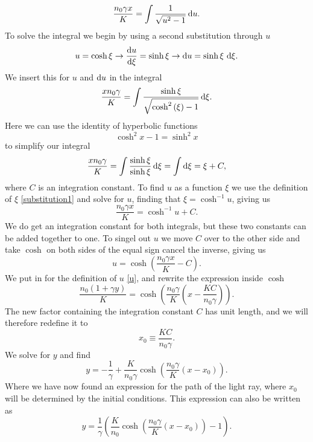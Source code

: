 \documentclass[12pt,twoside]{article}
\begin{document}
\begin{equation}
   \frac{n_0\gamma x}{K} = \int \frac{1}{\sqrt{u^2-1}} \dif u.
\end{equation}
To solve the integral we begin by using a second substitution through $u$
\begin{equation}
  u = \cosh{\xi} \rightarrow \dv{u}{\xi} = \sinh{\xi} \rightarrow \dif u = \sinh{\xi} \, \dif \xi. \label{substitution1}
\end{equation}
We insert this for $u$ and $\dif u$ in the integral
\begin{equation}
   \frac{xn_0\gamma}{K} = \int \frac{\sinh{\xi}}{\sqrt{\cosh^2{(\xi)}-1}} \dif \xi.
\end{equation}
Here we can use the identity of hyperbolic functions
\begin{equation}
\cosh^2{x} -1 = \sinh^2{x}
\end{equation}
to simplify our integral
\begin{equation}
   \frac{xn_0\gamma}{K} = \int \frac{\sinh{\xi}}{\sinh{\xi}} \dif \xi = \int \dif \xi = \xi + C,
\end{equation}
where $C$ is an integration constant.
To find $u$ as a function $\xi$ we use the definition of $\xi$ \eqref{substitution1} and solve for $u$, finding that $\xi = \cosh^{-1}{u}$, giving us
\begin{equation}
   \frac{n_0\gamma x}{K} = \cosh^{-1}{u} + C.
\end{equation}
We do get an integration constant for both integrals, but these two constants can be added together to one. To singel out $u$ we move $C$ over to the other side and take $\cosh{}$ on both sides of the equal sign cancel the inverse, giving us
\begin{equation}
   u = \cosh{\left(\frac{n_0\gamma x}{K}-C\right)}.
\end{equation}
We put in for the definition of $u$ \eqref{u}, and rewrite the expression inside $\cosh{}$
\begin{equation}
   \frac{n_0\left(1+\gamma y\right)}{K} = \cosh{\left(\frac{n_0\gamma}{K}\left(x-\frac{KC}{n_0\gamma}\right)\right)}.
\end{equation}
The new factor containing the integration constant $C$ has unit length, and we will therefore redefine it to
\begin{equation}
  x_0 \equiv \frac{KC}{n_0\gamma} .
\end{equation}
We solve for $y$ and find
\begin{equation}
   y = -\frac{1}{\gamma} + \frac{K}{n_0\gamma}\cosh{\left(\frac{n_0\gamma}{K}\left(x-x_0\right)\right)}.
\end{equation}
Where we have now found an expression for the path of the light ray, where $x_0$ will be determined by the initial conditions. This expression can also be written as
\begin{equation}
   y = \frac{1}{\gamma}\left(\frac{K}{n_0}\cosh{\left(\frac{n_0\gamma}{K}\left(x-x_0\right)\right)}-1\right). \label{2b}
\end{equation}
\end{document}
